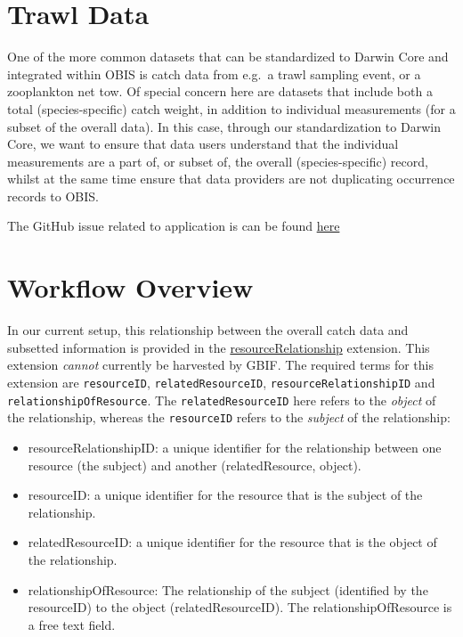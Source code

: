 \documentclass[
]{book}
\providecommand{\tightlist}{%
  \setlength{\itemsep}{0pt}\setlength{\parskip}{0pt}}
\begin{document}
\hypertarget{trawl-data}{%
\section{Trawl Data}\label{trawl-data}}

One of the more common datasets that can be standardized to Darwin Core and integrated within OBIS is catch data from e.g.~a trawl sampling event, or a zooplankton net tow. Of special concern here are datasets that include both a total (species-specific) catch weight, in addition to individual measurements (for a subset of the overall data). In this case, through our standardization to Darwin Core, we want to ensure that data users understand that the individual measurements are a part of, or subset of, the overall (species-specific) record, whilst at the same time ensure that data providers are not duplicating occurrence records to OBIS.

The GitHub issue related to application is can be found \href{https://github.com/iobis/env-data/issues/10}{here}

\hypertarget{workflow-overview}{%
\section{Workflow Overview}\label{workflow-overview}}

In our current setup, this relationship between the overall catch data and subsetted information is provided in the \href{https://tools.gbif.org/dwca-validator/extension.do?id=dwc:ResourceRelationship}{resourceRelationship} extension. This extension \emph{cannot} currently be harvested by GBIF. The required terms for this extension are \texttt{resourceID}, \texttt{relatedResourceID}, \texttt{resourceRelationshipID} and \texttt{relationshipOfResource}. The \texttt{relatedResourceID} here refers to the \emph{object} of the relationship, whereas the \texttt{resourceID} refers to the \emph{subject} of the relationship:

\begin{itemize}
\tightlist
\item
  resourceRelationshipID: a unique identifier for the relationship between one resource (the subject) and another (relatedResource, object).
\item
  resourceID: a unique identifier for the resource that is the subject of the relationship.
\item
  relatedResourceID: a unique identifier for the resource that is the object of the relationship.
\item
  relationshipOfResource: The relationship of the subject (identified by the resourceID) to the object (relatedResourceID). The relationshipOfResource is a free text field.
\end{itemize}
\end{document}
